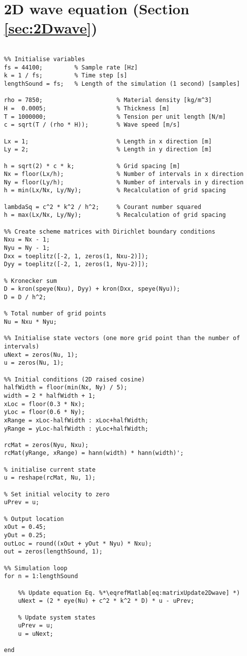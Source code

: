 \section{2D wave equation (Section \ref{sec:2Dwave})}
\label{app:2DWave}
\begin{lstlisting}

%% Initialise variables
fs = 44100;         % Sample rate [Hz]
k = 1 / fs;         % Time step [s]
lengthSound = fs;   % Length of the simulation (1 second) [samples]             

rho = 7850;                     % Material density [kg/m^3]
H =  0.0005;                    % Thickness [m]
T = 1000000;                    % Tension per unit length [N/m]
c = sqrt(T / (rho * H));        % Wave speed [m/s]

Lx = 1;                         % Length in x direction [m]
Ly = 2;                         % Length in y direction [m]

h = sqrt(2) * c * k;            % Grid spacing [m]
Nx = floor(Lx/h);               % Number of intervals in x direction
Ny = floor(Ly/h);               % Number of intervals in y direction
h = min(Lx/Nx, Ly/Ny);          % Recalculation of grid spacing

lambdaSq = c^2 * k^2 / h^2;     % Courant number squared
h = max(Lx/Nx, Ly/Ny);          % Recalculation of grid spacing

%% Create scheme matrices with Dirichlet boundary conditions 
Nxu = Nx - 1;
Nyu = Ny - 1;
Dxx = toeplitz([-2, 1, zeros(1, Nxu-2)]);
Dyy = toeplitz([-2, 1, zeros(1, Nyu-2)]);

% Kronecker sum
D = kron(speye(Nxu), Dyy) + kron(Dxx, speye(Nyu));
D = D / h^2;

% Total number of grid points
Nu = Nxu * Nyu;
    
%% Initialise state vectors (one more grid point than the number of intervals)
uNext = zeros(Nu, 1); 
u = zeros(Nu, 1);

%% Initial conditions (2D raised cosine)
halfWidth = floor(min(Nx, Ny) / 5);
width = 2 * halfWidth + 1;
xLoc = floor(0.3 * Nx);
yLoc = floor(0.6 * Ny);
xRange = xLoc-halfWidth : xLoc+halfWidth;
yRange = yLoc-halfWidth : yLoc+halfWidth;

rcMat = zeros(Nyu, Nxu);
rcMat(yRange, xRange) = hann(width) * hann(width)';

% initialise current state  
u = reshape(rcMat, Nu, 1); 

% Set initial velocity to zero
uPrev = u;

% Output location
xOut = 0.45;
yOut = 0.25;
outLoc = round((xOut + yOut * Nyu) * Nxu);
out = zeros(lengthSound, 1);

%% Simulation loop
for n = 1:lengthSound
    
    %% Update equation Eq. %*\eqrefMatlab[eq:matrixUpdate2Dwave] *)
    uNext = (2 * eye(Nu) + c^2 * k^2 * D) * u - uPrev;
    
    % Update system states
    uPrev = u;
    u = uNext;
    
end
\end{lstlisting}
